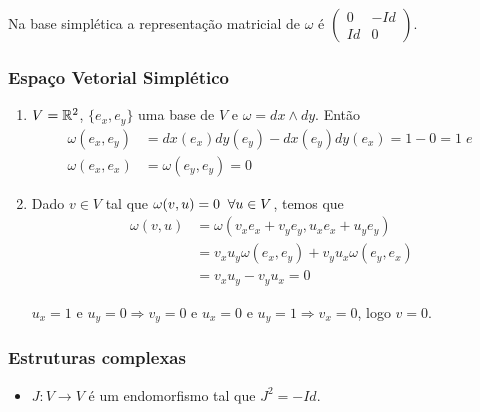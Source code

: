\documentclass{beamer}
\begin{document}
\begin{footnotesize}
\begin{frame}
		\begin{observacao}
			Na base simplética a representação matricial de $\omega$ é $\left(
			\begin{array}{cc}
			0 & -Id
			\\
			Id & 0
			\end{array}
			\right) $.
		\end{observacao}
	\end{frame}
	
	\begin{frame}
		\frametitle{Espaço Vetorial Simplético}
	\begin{exemplo}
			\begin{enumerate}
				\item $V = \mathbb{R}^{2}$, $\{e_{x}, e_{y}\}$ uma base de $V$ e $\omega=dx \wedge dy$. Então 
				$$
				\begin{aligned}
					\omega(e_{x}, e_{y}) &=dx(e_{x}) dy(e_{y}) - dx(e_{y}) dy(e_{x}) = 1-0= 1 \; e\; 
					\\
					\omega(e_{x}, e_{x}) &= \omega(e_{y}, e_{y}) = 0	
				\end{aligned}
				$$ 
				
				\item Dado $v \in V$ tal que $\omega(v, u)=0 \;\;\forall u \in V$, temos que 
				$$
				\begin{aligned}
					\omega(v, u) &= \omega(v_{x}e_{x}+v_{y}e_{y}, u_{x}e_{x}+u_{y}e_{y})
					\\
					&=
					v_{x}u_{y}\omega(e_{x}, e_{y}) +v_{y}u_{x}\omega(e_{y}, e_{x})
					\\
					&= v_{x}u_{y} -v_{y}u_{x} = 0
				\end{aligned}
				$$
				
				$u_{x} = 1$ e $u_{y} = 0 \Rightarrow v_{y} = 0$ e $u_{x} = 0$ e $u_{y} = 1 \Rightarrow v_{x} = 0$, logo $v=0$.
				
			\end{enumerate}			
		\end{exemplo}
	\end{frame}
	
	\begin{frame}
		\frametitle{Estruturas complexas}
		
		\begin{definicao}
			\begin{itemize}
				\item $J: V \to V$ é um endomorfismo tal que $J^{2} = -Id$. 
				

\end{itemize}
\end{definicao}
\end{frame}
\end{footnotesize}
\end{document}
